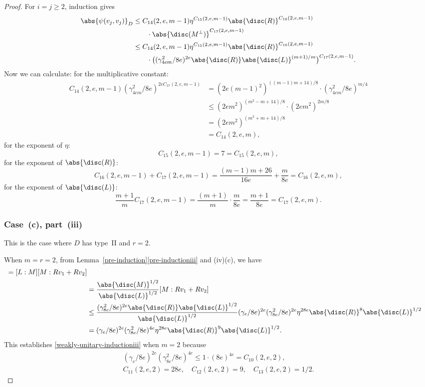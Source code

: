 \begin{proof}
For $i=j \geq 2$, induction gives
\begin{align*}
\abs{\psi(v_j, v_j)}_D
& \leq C_{14}(2,e,m-1) \eta^{C_{15}(2,e,m-1)} \abs{\disc(R)}^{C_{16} (2,e,m-1)}
\\& \qquad \cdot \abs{\disc(M^\perp)}^{C_{17}(2,e,m-1)}
\\& \leq C_{14}(2,e,m-1) \eta^{C_{15}(2,e,m-1)} \abs{\disc(R)}^{C_{16}(2,e,m-1)}
\\& \qquad \cdot \bigl( (\gamma_{4em}^2/8e)^{2e} \abs{\disc(R)} \abs{\disc(L)}^{(m+1)/m} \bigr)^{C_{17}(2,e,m-1)}.
\end{align*}
Now we can calculate:
for the multiplicative constant:
\begin{align*}
C_{14}(2,e,m-1) (\gamma_{4em}^2/8e)^{2eC_{17}(2,e,m-1)}
& = (2e(m-1)^2)^{((m-1)m+14)/8} \cdot (\gamma_{4em}^2/8e)^{m/4}
\\& \leq (2em^2)^{(m^2-m+14)/8} \cdot (2em^2)^{2m/8}
\\& = (2em^2)^{(m^2+m+14)/8}
\\& = C_{14}(2,e,m),
\end{align*}
for the exponent of $\eta$:
\[
C_{15}(2,e,m-1) = 7 = C_{15}(2,e,m),
\]
for the exponent of $\abs{\disc(R)}$:
\[
C_{16}(2,e,m-1) + C_{17}(2,e,m-1) = \frac{(m-1)m+26}{16e} + \frac{m}{8e}
= C_{16}(2, e, m),
\]
for the exponent of $\abs{\disc(L)}$:
\[
\frac{m+1}{m} C_{17}(2,e,m-1)= \frac{(m+1)}{m} \cdot \frac{m}{8e}
= \frac{m+1}{8e}
= C_{17}(2,e,m).
\]

\subsubsection*{Case~(c), part~(iii)}
This is the case where $D$ has type~II and $r=2$.

When $m=r=2$, from Lemma~\ref{pre-induction}\eqref{pre-inductioniii} and (iv)(c), we have
\begin{align*}
[L&:Rv_1 + Rv_2]
= [L:M][M:Rv_1 + Rv_2]
\\& = \frac{\abs{\disc(M)}^{1/2}}{\abs{\disc(L)}^{1/2}} [M:Rv_1 + Rv_2]
\\& \leq \frac{(\gamma_{8e}^2/8e)^{2e} \abs{\disc(R)} \abs{\disc(L)}^{1/2}}{\abs{\disc(L)}^{1/2}} (\gamma_e/8e)^{2e} (\gamma_{8e}^2/8e)^{2e} \eta^{28e} \abs{\disc(R)}^8 \abs{\disc(L)}^{1/2}
\\& = (\gamma_e/8e)^{2e} (\gamma_{8e}^2/8e)^{4e} \eta^{28e} \abs{\disc(R)}^9 \abs{\disc(L)}^{1/2}.
\end{align*}
This establishes \eqref{weakly-unitary-inductioniii} when $m=2$ because
\begin{gather*}
(\gamma_e/8e)^{2e} (\gamma_{8e}^2/8e)^{4e}
\leq 1 \cdot (8e)^{4e}
= C_{10}(2,e,2),
\\ C_{11}(2,e,2) = 28e,
\quad C_{12}(2,e,2) = 9,
\quad C_{13}(2,e,2) = 1/2.
\end{gather*}


\end{proof}
